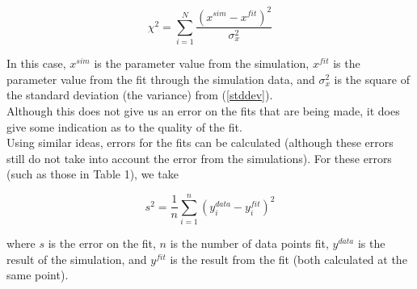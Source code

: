 \documentclass{article}
\begin{document}
\begin{multicols}{2}
\begin{equation}
\chi ^2 = \sum \limits _{i=1} ^N \frac{(x^{sim} - x^{fit})^2}{\sigma _x ^2}
\end{equation}

\noindent In this case, $x^{sim}$ is the parameter value from the simulation, $x^{fit}$ is the parameter value from the fit through the simulation data, and $\sigma _x ^2$ is the square of the standard deviation (the variance) from (\ref{stddev}). \\

Although this does not give us an error on the fits that are being made, it does give some indication as to the quality of the fit.\\

Using similar ideas, errors for the fits can be calculated (although these errors still do not take into account the error from the simulations).  For these errors (such as those in Table 1), we take

\begin{equation}
s^2 = \frac{1}{n} \sum \limits _{i=1} ^{n} (y^{data}_i - y^{fit}_i)^2
\end{equation}

\noindent where $s$ is the error on the fit, $n$ is the number of data points fit, $y^{data}$ is the result of the simulation, and $y^{fit}$ is the result from the fit (both calculated at the same point).  \cite{staterr}

\end{multicols}


\end{document}
